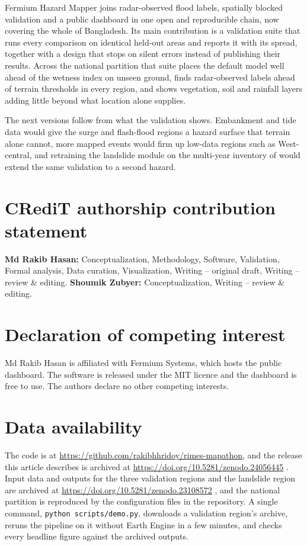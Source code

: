 \documentclass[preprint,12pt]{elsarticle}
\newcommand{\SoftwareDOI}{\url{https://doi.org/10.5281/zenodo.24056445}}
\begin{document}
Fermium Hazard Mapper joins radar-observed flood labels, spatially blocked validation and a public dashboard in one open and reproducible chain, now covering the whole of Bangladesh. Its main contribution is a validation suite that runs every comparison on identical held-out areas and reports it with its spread, together with a design that stops on silent errors instead of publishing their results. Across the national partition that suite places the default model well ahead of the wetness index on unseen ground, finds radar-observed labels ahead of terrain thresholds in every region, and shows vegetation, soil and rainfall layers adding little beyond what location alone supplies.

The next versions follow from what the validation shows. Embankment and tide data would give the surge and flash-flood regions a hazard surface that terrain alone cannot, more mapped events would firm up low-data regions such as West-central, and retraining the landslide module on the multi-year inventory of \citet{rabby2019} would extend the same validation to a second hazard.

\sloppy
\section*{CRediT authorship contribution statement}
\textbf{Md Rakib Hasan:} Conceptualization, Methodology, Software, Validation, Formal analysis, Data curation, Visualization, Writing -- original draft, Writing -- review \& editing. \textbf{Shoumik Zubyer:} Conceptualization, Writing -- review \& editing.

\section*{Declaration of competing interest}
Md Rakib Hasan is affiliated with Fermium Systems, which hosts the public dashboard. The software is released under the MIT licence and the dashboard is free to use. The authors declare no other competing interests.

\section*{Data availability}
The code is at \url{https://github.com/rakibhhridoy/rimes-mapathon}, and the release this article describes is archived at \SoftwareDOI{} \citep{hasan2026software}. Input data and outputs for the three validation regions and the landslide region are archived at \url{https://doi.org/10.5281/zenodo.23108572} \citep{hasan2026data}, and the national partition is reproduced by the configuration files in the repository. A single command, \texttt{python scripts/demo.py}, downloads a validation region's archive, reruns the pipeline on it without Earth Engine in a few minutes, and checks every headline figure against the archived outputs.
\end{document}

